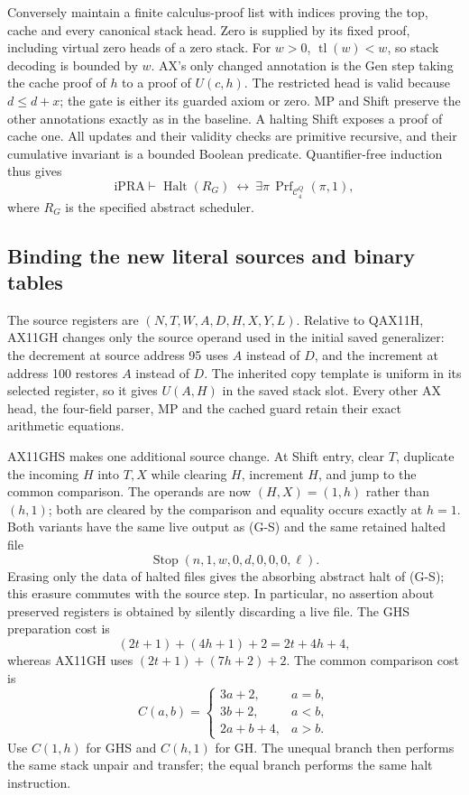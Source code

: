 Conversely maintain a finite calculus-proof list with indices proving
the top, cache and every canonical stack head.  Zero is supplied by its
fixed proof, including virtual zero heads of a zero stack.  For $w>0$,
$\operatorname{tl}(w)<w$, so stack decoding is bounded by $w$.
AX's only changed annotation is the Gen step taking the cache proof
of $h$ to a proof of $U(c,h)$.  The restricted head is valid because
$d\le d+x$; the gate is either its guarded axiom or zero.  MP and
Shift preserve the other annotations exactly as in the baseline.
A halting Shift exposes a proof of cache one.  All updates and their
validity checks are primitive recursive, and their cumulative invariant
is a bounded Boolean predicate.  Quantifier-free induction thus gives
\[
 \mathrm{iPRA}\vdash
 \operatorname{Halt}(R_G)\ \longleftrightarrow\
              \exists\pi\,\operatorname{Prf}_{\mathcal C_4^Q}(\pi,1),
                                                               \tag{G-Log}
\]
where $R_G$ is the specified abstract scheduler.

\subsection{Binding the new literal sources and binary tables}

The source registers are $(N,T,W,A,D,H,X,Y,L)$.  Relative to
QAX11H, AX11GH changes only the source operand used in the initial
saved generalizer: the decrement at source address 95 uses $A$
instead of $D$, and the increment at address 100 restores $A$
instead of $D$.  The inherited copy template is uniform in its
selected register, so it gives $U(A,H)$ in the saved stack slot.
Every other AX head, the four-field parser, MP and the cached guard
retain their exact arithmetic equations.

AX11GHS makes one additional source change.  At Shift entry, clear
$T$, duplicate the incoming $H$ into $T,X$ while clearing $H$,
increment $H$, and jump to the common comparison.  The operands
are now $(H,X)=(1,h)$ rather than $(h,1)$; both are cleared by
the comparison and equality occurs exactly at $h=1$.  Both variants
have the same live output as (G-S) and the same retained halted file
\[
 \operatorname{Stop}(n,1,w,0,d,0,0,0,\ell).
\]
Erasing only the data of halted files gives the absorbing abstract halt
of (G-S); this erasure commutes with the source step.  In particular,
no assertion about preserved registers is obtained by silently discarding
a live file.  The GHS preparation cost is
\[
 (2t+1)+(4h+1)+2=2t+4h+4,
\]
whereas AX11GH uses $(2t+1)+(7h+2)+2$.  The common comparison
cost is
\[
 C(a,b)=\begin{cases}
 3a+2,&a=b,\\3b+2,&a<b,\\2a+b+4,&a>b.
 \end{cases}
\]
Use $C(1,h)$ for GHS and $C(h,1)$ for GH.  The unequal branch
then performs the same stack unpair and transfer; the equal branch
performs the same halt instruction.

